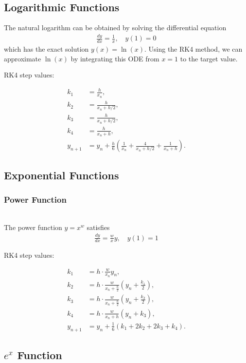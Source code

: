 \documentclass[conference]{IEEEtran}
\begin{document}
\subsection{Logarithmic Functions}

The natural logarithm can be obtained by solving the differential equation \cite{ncert12}
\begin{align}
\frac{dy}{dx} = \frac{1}{x}, \quad y(1)=0
\end{align}
which has the exact solution $y(x)=\ln(x)$. Using the RK4 method, we can approximate $\ln(x)$ by integrating this ODE from $x=1$ to the target value.

RK4 step values:

\begin{align}
k_1 &= \frac{h}{x_n}, \\
k_2 &= \frac{h}{x_n+h/2}, \\
k_3 &= \frac{h}{x_n+h/2}, \\
k_4 &= \frac{h}{x_n+h}, \\
y_{n+1} &= y_n+\frac{h}{6}\left(\frac{1}{x_n}+\frac{4}{x_n+h/2}+\frac{1}{x_n+h}\right).
\end{align}

\subsection{Exponential Functions}

\subsubsection{Power Function} \\
The power function $y=x^w$ \cite{ncert12} satisfies
\begin{align}
\frac{dy}{dx} = \frac{w}{x}y, \quad y(1)=1
\end{align}

RK4 step values:

\begin{align}
k_1 &= h \cdot \frac{w}{x_n}y_n, \\
k_2 &= h \cdot \frac{w}{x_n+\tfrac{h}{2}}\left(y_n+\tfrac{k_1}{2}\right), \\
k_3 &= h \cdot \frac{w}{x_n+\tfrac{h}{2}}\left(y_n+\tfrac{k_2}{2}\right), \\
k_4 &= h \cdot \frac{w}{x_n+h}\left(y_n+k_3\right), \\
y_{n+1} &= y_n+\tfrac{1}{6}(k_1+2k_2+2k_3+k_4).
\end{align}

\subsection{$e^x$ Function}
\end{document}
